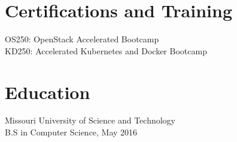 \documentclass[margin]{res}
\begin{document}
\section{Certifications and Training}
  OS250: OpenStack Accelerated Bootcamp \\
  KD250: Accelerated Kubernetes and Docker Bootcamp
 
\section{Education}
  Missouri University of Science and Technology \\ 
  B.S in Computer Science, May 2016
  
  
\end{document}
